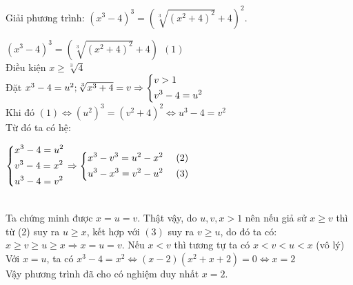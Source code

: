 \begin{ex}%
Giải phương trình: $(x^3-4)^3=\left(\sqrt[3]{(x^2+4)^2}+4\right)^2$.
\loigiai
{$(x^3-4)^3=\left(\sqrt[3]{(x^2+4)^2}+4\right)\ \ (1)$\\
Điều kiện $x\geq \sqrt[3]{4}$\\
Đặt $x^3-4=u^2; \sqrt[3]{x^3+4}=v \Rightarrow \left\{\begin{aligned}&v>1\\&v^3-4=u^2\end{aligned}\right.$\\
Khi đó $(1) \Leftrightarrow (u^2)^3=(v^2+4)^2 \Leftrightarrow  u^3-4=v^2$\\
Từ đó ta có hệ:\\
\centerline{$\heva{&x^3-4=u^2\\&v^3-4=x^2\\&u^3-4=v^2}\Rightarrow \heva{&x^3-v^3=u^2-x^2&\ (2)\\&u^3-x^3=v^2-u^2&\ (3)}$}\\
Ta chứng minh được $x=u=v$. Thật vậy, do $u, v, x>1$ nên nếu giả sử $x\geq v$ thì từ (2) suy ra $u\geq x$, kết hợp với $(3)$ suy ra $v\geq u$, do đó ta có: $x\geq v \geq u \geq x \Rightarrow x=u=v$. Nếu $x<v$ thì tương tự ta có $x<v<u<x$ (vô lý)\\
Với $x=u$, ta có $x^3-4=x^2 \Leftrightarrow (x-2)(x^2+x+2)=0 \Leftrightarrow x=2$\\
Vậy phương trình đã cho có nghiệm duy nhất $x=2$.
}
\end{ex}
